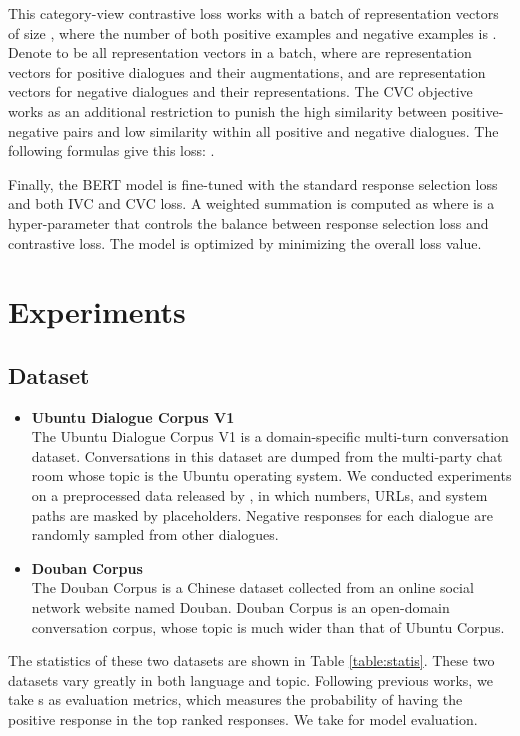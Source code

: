 \documentclass[letterpaper]{article} \usepackage{aaai22}  \usepackage{times}  \usepackage{helvet}  \usepackage{courier}  \usepackage[hyphens]{url}  \usepackage{graphicx} \urlstyle{rm} \def\UrlFont{\rm}  \usepackage{natbib}  \usepackage{caption} \DeclareCaptionStyle{ruled}{labelfont=normalfont,labelsep=colon,strut=off} \frenchspacing  \setlength{\pdfpagewidth}{8.5in}  \setlength{\pdfpageheight}{11in}  \usepackage{algorithm}
\begin{document}
This category-view contrastive loss works with a batch of representation vectors of size , where the number of both positive examples and negative examples is . Denote  to be all representation vectors in a batch, where  are representation vectors for positive dialogues and their augmentations, and  are representation vectors for negative dialogues and their representations. The CVC objective works as an additional restriction to punish the high similarity between positive-negative pairs and low similarity within all positive and negative dialogues. The following formulas give this loss:
.

Finally, the BERT model is fine-tuned with the standard response selection loss  and both IVC and CVC loss. A weighted summation is computed as
 where  is a hyper-parameter that controls the balance between response selection loss and contrastive loss. The model is optimized by minimizing the overall loss value.
 \section{Experiments}

\subsection{Dataset}

\begin{itemize}
    \item \textbf{Ubuntu Dialogue Corpus V1}\\ The Ubuntu Dialogue Corpus V1 \cite{lowe2015ubuntu} is a domain-specific multi-turn conversation dataset. Conversations in this dataset are dumped from the multi-party chat room whose topic is the Ubuntu operating system. We conducted experiments on a preprocessed data released by \citet{xu2019bert}, in which numbers, URLs, and system paths are masked by placeholders. Negative responses for each dialogue are randomly sampled from other dialogues.
    \item \textbf{Douban Corpus}\\ The Douban Corpus\cite{wu2016sequential} is a Chinese dataset collected from an online social network website named Douban. Douban Corpus is an open-domain conversation corpus, whose topic is much wider than that of Ubuntu Corpus.
\end{itemize}

The statistics of these two datasets are shown in Table \ref{table:statis}. These two datasets vary greatly in both language and topic. Following previous works, we take s as evaluation metrics, which measures the probability of having the positive response in the top  ranked responses. We take  for model evaluation.
\end{document}
